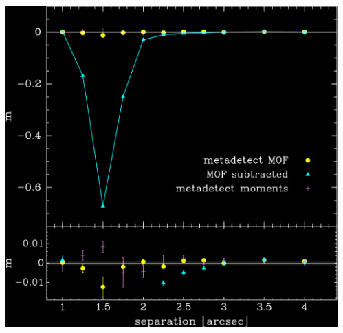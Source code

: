 \documentclass{beamer}
\begin{document}
\begin{frame}
\begin{columns}
\begin{column}{0.5\textwidth}
\begin{itemize}
            \end{itemize}
        \end{column}
        \begin{column}{0.5\textwidth}
            \begin{center}
                \includegraphics[width=\columnwidth]{pairs-mc-bdkpair-negate.png}
            \end{center}
        \end{column}
    \end{columns}
\end{frame}
\end{document}
